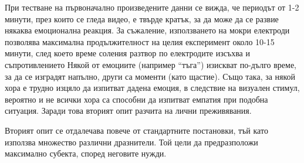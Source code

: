 \documentclass[main.tex]{subfiles}
\begin{document}
При тестване на първоначално произведените данни се вижда, че периодът от 1-2 минути, през които се гледа видео, е твърде кратък, за да може да се развие някаква емоционална реакция. За съжаление, използването на мокри електроди позволява максимална продължителност на целия експеримент около 10-15 минути, след което време соления разтвор по електродите изсъхва и съпротивлението Някой от емоциите (например ``тъга'') изискват по-дълго време, за да се изградят напълно, други са моменти (като щастие). Също така, за някой хора е трудно изцяло да изпитват дадена емоция, в следствие на визуален стимул, вероятно и не всички хора са способни да изпитват емпатия при подобна ситуация. Заради това вторият опит разчита на лични преживявания.

Вторият опит се отдалечава повече от стандартните постановки, тъй като използва множество различни дразнители. Той цели да предразположи максимално субекта, според неговите нужди.
\end{document}
